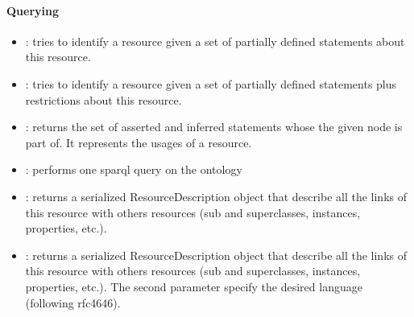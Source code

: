 \paragraph{Querying}
\begin{itemize}

    \item {}: tries to identify a resource given a
    set of partially defined statements about this resource.

    \item {}: tries to identify a resource
    given a set of partially defined statements plus restrictions about this
    resource.

    \item {}: returns the set of asserted and
    inferred statements whose the given node is part of. It represents the
    usages of a resource.

    \item {}: performs one sparql query on the
    ontology

    \item {}: returns a serialized
    ResourceDescription object that describe all the links of this resource
    with others resources (sub and superclasses, instances, properties, etc.).

    \item {}: returns a serialized
    ResourceDescription object that describe all the links of this resource
    with others resources (sub and superclasses, instances, properties, etc.).
    The second parameter specify the desired language (following rfc4646).
\end{itemize}

